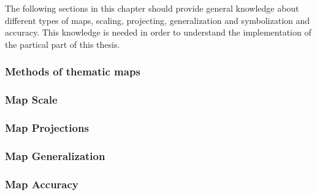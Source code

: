 The following sections in this chapter should provide general knowledge about different types of maps, scaling, projecting, generalization and symbolization and accuracy. This knowledge is needed in order to understand the implementation of the partical part of this thesis.

\subsubsection{Methods of thematic maps}


\subsubsection{Map Scale}
\label{s:map-scale}


\subsubsection{Map Projections}

\label{s:map-projections}

\subsubsection{Map Generalization}


\subsubsection{Map Accuracy}
\label{s:map-accuracy}

